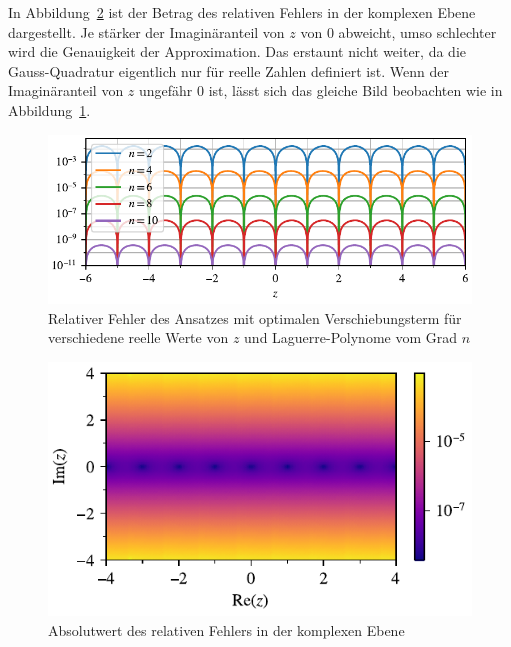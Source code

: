 In Abbildung~\ref{laguerre:fig:rel_error_complex}
ist der Betrag des relativen Fehlers in der komplexen Ebene dargestellt.
Je stärker der Imaginäranteil von $z$ von $0$ abweicht,
umso schlechter wird die Genauigkeit der Approximation.
Das erstaunt nicht weiter,
da die Gauss-Quadratur eigentlich nur für reelle Zahlen definiert ist.
Wenn der Imaginäranteil von $z$ ungefähr $0$ ist,
lässt sich das gleiche Bild beobachten wie in
Abbildung~\ref{laguerre:fig:rel_error_range}.

\begin{figure}
\centering
% 
\includegraphics{papers/laguerre/images/rel_error_range.pdf}
\caption{Relativer Fehler des Ansatzes mit optimalen Verschiebungsterm
für verschiedene reelle Werte von $z$ und Laguerre-Polynome vom Grad $n$}
\label{laguerre:fig:rel_error_range}
\end{figure}

\begin{figure}
\centering
\includegraphics{papers/laguerre/images/rel_error_complex.pdf}
\caption{Absolutwert des relativen Fehlers in der komplexen Ebene}
\label{laguerre:fig:rel_error_complex}
\end{figure}

